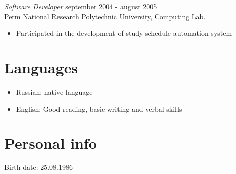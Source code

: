 \documentclass[13pt]{res}
\begin{document}
\begin{resume}
{\sl Software Developer} \hfill september 2004 - august 2005 \\
Perm National Research Polytechnic University, Computing Lab.
\begin{itemize}
\item Participated in the development of study schedule automation system
\end{itemize} 

\section{Languages}
\begin{itemize}
\item Russian: native language
\item English: Good reading, basic writing and verbal skills
\end{itemize}

\section{Personal info}
Birth date: 25.08.1986

\end{resume}
\end{document}
